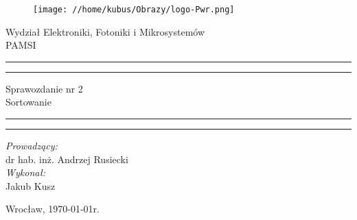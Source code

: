 \begin{titlepage}
\begin{figure}
	\centering
	\texttt{[image: //home/kubus/Obrazy/logo-Pwr.png]}
	
	\label{fig:pwr}
\end{figure}
	\begin{center}
		\huge Wydział Elektroniki, Fotoniki i Mikrosystemów \\ 
		\vspace{40pt}
		\huge PAMSI  \\
	\end{center}
	\vspace{60pt}
	\hrule
	\vspace{1pt}
	\hrule
	\begin{center}
		{\fontsize{40}{50}\selectfont Sprawozdanie nr 2\\ }
		\vspace{10pt}
		{\fontsize{25}{25}\selectfont Sortowanie  }
	\end{center}
	\hrule
	\vspace{1pt}
	\hrule
	\begin{flushright}
		\vspace{65pt}
		\textit{\Large Prowadzący:}\\
		
		\Large dr hab. inż. Andrzej Rusiecki\\
		\vspace{10pt}
		\textit{\Large Wykonał:}\\
		
		\Large Jakub Kusz \\
	
	\end{flushright}
	\vspace{100pt}
	\begin{center}
		\large Wrocław, \today r.
	\end{center}
\end{titlepage}

